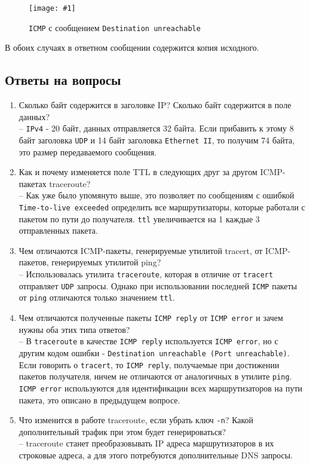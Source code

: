 \documentclass[12pt, a4paper]{article}
\newcommand{\figc}[4]{
  \begin{figure}[H]
  \begin{center}
    \texttt{[image: \#1]}
    \caption{#2}
    \label{fig:#3}
  \end{center}
  \end{figure}
}
\begin{document}
\figc{icmp_dest_unreach}{\texttt{ICMP} с сообщением \texttt{Destination unreachable}}{i_d_u}{3.0}

В обоих случаях в ответном сообщении содержится копия исходного.

\subsection{Ответы на вопросы}

\begin{enumerate}
  \item Сколько байт содержится в заголовке IP? Сколько байт содержится в поле данных?\\
    -- \texttt{IPv4} - 20 байт, данных отправляется 32 байта. Если прибавить к
    этому 8 байт заголовка \texttt{UDP} и 14 байт заголовка \texttt{Ethernet II},
    то получим 74 байта, это размер передаваемого сообщения.
  \item Как и почему изменяется поле TTL в следующих друг за другом ICMP-пакетах traceroute?\\
    -- Как уже было упомянуто выше, это позволяет по сообщениям с ошибкой
    \texttt{Time-to-live exceeded} определить все маршрутизаторы, которые
    работали с пакетом по пути до получателя. \texttt{ttl} увеличивается на 1
    каждые 3 отправленных пакета.
  \item  Чем отличаются ICMP-пакеты, генерируемые утилитой tracert, от
    ICMP-пакетов, генерируемых утилитой ping?\\
    -- Использовалась утилита \texttt{traceroute}, которая в отличие от
    \texttt{tracert} отправляет \texttt{UDP} запросы. Однако при использовании
    последней \texttt{ICMP} пакеты от \texttt{ping} отличаются только значением
    \texttt{ttl}.
  \item Чем отличаются полученные пакеты \texttt{ICMP reply} от \texttt{ICMP error} и зачем
    нужны оба этих типа ответов?\\
    -- В \texttt{traceroute} в качестве \texttt{ICMP reply} используется
    \texttt{ICMP error}, но с другим кодом ошибки - \texttt{Destination unreachable (Port unreachable)}.
    Если говорить о \texttt{tracert}, то \texttt{ICMP reply}, получаемые при
    достижении пакетов получателя, ничем не отличаются от аналогичных в утилите
    \texttt{ping}. \texttt{ICMP error} используются для идентификации всех
    маршрутизаторов на пути пакета, это описано в предыдущем вопросе.
  \item Что изменится в работе traceroute, если убрать ключ \texttt{-n}? Какой
    дополнительный трафик при этом будет генерироваться?\\
    -- traceroute станет преобразовывать IP адреса маршрутизаторов в их строковые
    адреса, а для этого потребуются дополнительные DNS запросы.
\end{enumerate}
\end{document}
